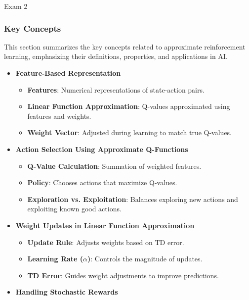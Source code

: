 \begin{examnotes}{Exam 2}
    \subsubsection*{Key Concepts}
    
    \begin{highlight}
        This section summarizes the key concepts related to approximate reinforcement learning, emphasizing their definitions, properties, and applications in AI.
        
        \begin{itemize}
            \item \textbf{Feature-Based Representation}
                \begin{itemize}
                    \item \textbf{Features}: Numerical representations of state-action pairs.
                    \item \textbf{Linear Function Approximation}: Q-values approximated using features and weights.
                    \item \textbf{Weight Vector}: Adjusted during learning to match true Q-values.
                \end{itemize}
            \item \textbf{Action Selection Using Approximate Q-Functions}
                \begin{itemize}
                    \item \textbf{Q-Value Calculation}: Summation of weighted features.
                    \item \textbf{Policy}: Chooses actions that maximize Q-values.
                    \item \textbf{Exploration vs. Exploitation}: Balances exploring new actions and exploiting known good actions.
                \end{itemize}
            \item \textbf{Weight Updates in Linear Function Approximation}
                \begin{itemize}
                    \item \textbf{Update Rule}: Adjusts weights based on TD error.
                    \item \textbf{Learning Rate ($\alpha$)}: Controls the magnitude of updates.
                    \item \textbf{TD Error}: Guides weight adjustments to improve predictions.
                \end{itemize}
            \item \textbf{Handling Stochastic Rewards}

\end{itemize}
\end{highlight}
\end{examnotes}
